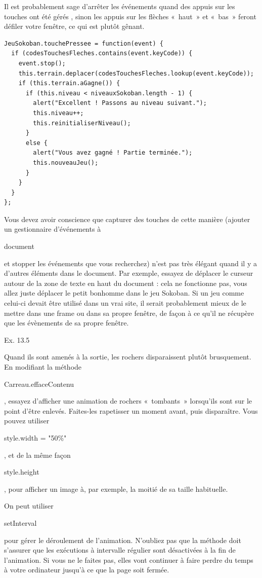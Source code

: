 \documentclass{FramateX}
\renewcommand{\texttt}[1]{\begin{sffamily}{#1}\end{sffamily}}
\begin{document}
Il est probablement sage d'arrêter les événements quand des appuis sur
les touches ont été gérés , sinon les appuis sur les flèches «~haut~» et
«~bas~» feront défiler votre fenêtre, ce qui est plutôt gênant.

\begin{lstlisting}
JeuSokoban.touchePressee = function(event) {
  if (codesTouchesFleches.contains(event.keyCode)) {
    event.stop();
    this.terrain.deplacer(codesTouchesFleches.lookup(event.keyCode));
    if (this.terrain.aGagne()) {
      if (this.niveau < niveauxSokoban.length - 1) {
        alert("Excellent ! Passons au niveau suivant.");
        this.niveau++;
        this.reinitialiserNiveau();
      }
      else {
        alert("Vous avez gagné ! Partie terminée.");
        this.nouveauJeu();
      }
    }
  }
};
\end{lstlisting}
Vous devez avoir conscience que capturer des touches de cette manière
(ajouter un gestionnaire d'événements à \texttt{document} et stopper les
événements que vous recherchez) n'est pas très élégant quand il y a
d'autres éléments dans le document. Par exemple, essayez de déplacer le
curseur autour de la zone de texte en haut du document : cela ne
fonctionne pas, vous allez juste déplacer le petit bonhomme dans le jeu
Sokoban. Si un jeu comme celui-ci devait être utilisé dans un vrai site,
il serait probablement mieux de le mettre dans une frame ou dans sa
propre fenêtre, de façon à ce qu'il ne récupère que les évènements de sa
propre fenêtre.

\begin{center}\end{center}

Ex. 13.5

Quand ils sont amenés à la sortie, les rochers disparaissent plutôt
brusquement. En modifiant la méthode \texttt{Carreau.effaceContenu},
essayez d'afficher une animation de rochers «~tombants~» lorsqu'ils sont
sur le point d'être enlevés. Faites-les rapetisser un moment avant, puis
disparaître. Vous pouvez utiliser \texttt{style.width = "50\%"}, et de
la même façon \texttt{style.height}, pour afficher un image à, par
exemple, la moitié de sa taille habituelle.

On peut utiliser \texttt{setInterval} pour gérer le déroulement de
l'animation. N'oubliez pas que la méthode doit s'assurer que les
exécutions à intervalle régulier sont désactivées à la fin de
l'animation. Si vous ne le faites pas, elles vont continuer à faire
perdre du temps à votre ordinateur jusqu'à ce que la page soit fermée.
\end{document}
